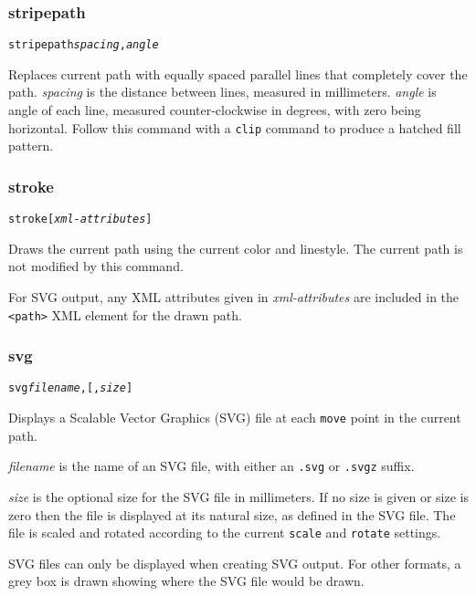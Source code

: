 \subsubsection{stripepath}

\begin{alltt}
stripepath \textit{spacing}, \textit{angle}
\end{alltt}

Replaces current path with equally spaced parallel lines that completely cover
the path.  \textit{spacing} is the distance between lines, measured in
millimeters.  \textit{angle} is angle of each line, measured
counter-clockwise in degrees, with zero being horizontal.  Follow this command
with a \texttt{clip} command to produce a hatched fill pattern.

\subsubsection{stroke}

\begin{alltt}
stroke [\textit{xml-attributes}]
\end{alltt}

Draws the current path using the current color and linestyle.
The current path is not modified by this command.

For SVG output, any XML attributes given in
\textit{xml-attributes} are
included in the \texttt{<path>} XML element for the drawn path.

\subsubsection{svg}

\begin{alltt}
svg \textit{filename}, [, \textit{size}]
\end{alltt}

Displays a Scalable Vector Graphics (SVG) file at each \texttt{move} point in
the current path.  

\textit{filename} is the name of an SVG file, with 
either an \texttt{.svg} or \texttt{.svgz} suffix.

\textit{size} is the optional size for the SVG file
in millimeters.  If no size
is given or size is zero then the file is displayed at its natural size,
as defined in the SVG file.
The file is scaled and rotated according to the current \texttt{scale}
and \texttt{rotate} settings.

SVG files can only be displayed when creating
SVG output.  For other formats,
a grey box is drawn showing where the SVG file
would be drawn.

